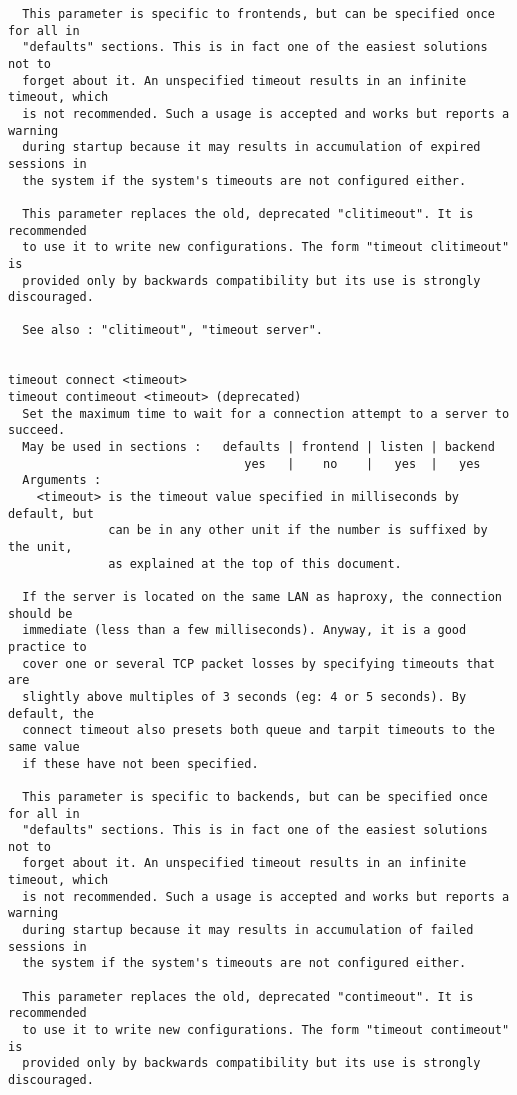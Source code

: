 \begin{verbatim}
  This parameter is specific to frontends, but can be specified once for all in
  "defaults" sections. This is in fact one of the easiest solutions not to
  forget about it. An unspecified timeout results in an infinite timeout, which
  is not recommended. Such a usage is accepted and works but reports a warning
  during startup because it may results in accumulation of expired sessions in
  the system if the system's timeouts are not configured either.

  This parameter replaces the old, deprecated "clitimeout". It is recommended
  to use it to write new configurations. The form "timeout clitimeout" is
  provided only by backwards compatibility but its use is strongly discouraged.

  See also : "clitimeout", "timeout server".


timeout connect <timeout>
timeout contimeout <timeout> (deprecated)
  Set the maximum time to wait for a connection attempt to a server to succeed.
  May be used in sections :   defaults | frontend | listen | backend
                                 yes   |    no    |   yes  |   yes
  Arguments :
    <timeout> is the timeout value specified in milliseconds by default, but
              can be in any other unit if the number is suffixed by the unit,
              as explained at the top of this document.

  If the server is located on the same LAN as haproxy, the connection should be
  immediate (less than a few milliseconds). Anyway, it is a good practice to
  cover one or several TCP packet losses by specifying timeouts that are
  slightly above multiples of 3 seconds (eg: 4 or 5 seconds). By default, the
  connect timeout also presets both queue and tarpit timeouts to the same value
  if these have not been specified.

  This parameter is specific to backends, but can be specified once for all in
  "defaults" sections. This is in fact one of the easiest solutions not to
  forget about it. An unspecified timeout results in an infinite timeout, which
  is not recommended. Such a usage is accepted and works but reports a warning
  during startup because it may results in accumulation of failed sessions in
  the system if the system's timeouts are not configured either.

  This parameter replaces the old, deprecated "contimeout". It is recommended
  to use it to write new configurations. The form "timeout contimeout" is
  provided only by backwards compatibility but its use is strongly discouraged.


\end{verbatim}
